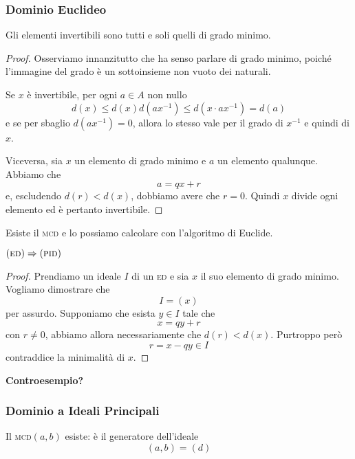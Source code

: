\begin{multicols}{2}
\subsubsection{Dominio Euclideo}

\begin{theorem}
	Gli elementi invertibili sono tutti e soli quelli di grado minimo.
\end{theorem}
\begin{proof}
	Osserviamo innanzitutto che ha senso parlare di grado minimo, poiché l'immagine del grado è un sottoinsieme non vuoto dei naturali.
	
	Se $ x $ è invertibile, per ogni $ a \in A $ non nullo
	\[ d(x) \leq d(x) d(ax^{-1}) \leq d(x \cdot ax^{-1}) = d(a) \]
	e se per sbaglio $ d(ax^{-1}) = 0 $, allora lo stesso vale per il grado di $ x^{-1} $ e quindi di $ x $.
	
	Viceversa, sia $ x $ un elemento di grado minimo e $ a $ un elemento qualunque. Abbiamo che
	\[ a = qx + r \]
	e, escludendo $ d(r) < d(x) $, dobbiamo avere che $ r = 0 $. Quindi $ x $ divide ogni elemento ed è pertanto invertibile. 
\end{proof}

\begin{theorem}
	Esiste il \textsc{mcd} e lo possiamo calcolare con l'algoritmo di Euclide.
\end{theorem}
	
\begin{theorem}
	$ (\textsc{ed})\Rightarrow(\textsc{pid}) $
\end{theorem}
\begin{proof}
	Prendiamo un ideale $ I $ di un \textsc{ed} e sia $ x $ il suo elemento di grado minimo. Vogliamo dimostrare che 
	\[ I = (x) \]
	per assurdo. Supponiamo che esista $ y \in I $ tale che
	\[ x = qy + r \]
	con $ r \neq 0 $, abbiamo allora necessariamente che $ d(r) < d(x) $. Purtroppo però
	\[ r = x - qy \in I \]
	contraddice la minimalità di $ x $.
\end{proof}

\textbf{Controesempio?} 

\subsubsection{Dominio a Ideali Principali}
\begin{remark}
	Il \textsc{mcd}$ (a, b) $ esiste: è il generatore dell'ideale $$  (a, b) = (d)  $$
\end{remark}


\end{multicols}
